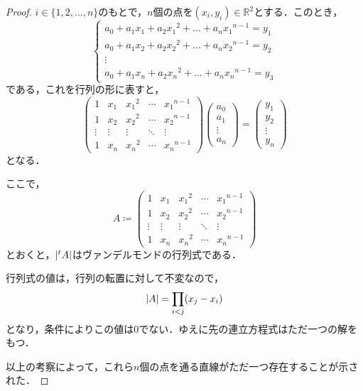 \documentclass[a4paper,10pt,fleqn]{ltjsarticle}
\begin{document}
\begin{tleftbar}
  \begin{proof}
    $i \in \{ 1,2,\ldots,n \}$のもとで，$n$個の点を$(x_i , y_i ) \in \mathbb{R}^2$とする．このとき，
    \[
      \begin{cases}
        a_0 + a_1 x_1 + a_2 {x_1}^2 + \dots + a_n {x_1}^{n-1} = y_1 \\
        a_0 + a_1 x_2 + a_2 {x_2}^2 + \dots + a_n {x_2}^{n-1} = y_2 \\
        \vdots                                                      \\
        a_0 + a_1 x_n + a_2 {x_n}^2 + \dots + a_n {x_n}^{n-1} = y_3
      \end{cases}
    \]
    である，これを行列の形に表すと，
    \[
      \begin{pmatrix}
        1      & x_1    & {x_1}^2 & \cdots & {x_1}^{n-1} \\
        1      & x_2    & {x_2}^2 & \cdots & {x_2}^{n-1} \\
        \vdots & \vdots & \vdots  & \ddots & \vdots      \\
        1      & x_n    & {x_n}^2 & \cdots & {x_n}^{n-1}
      \end{pmatrix}
      \begin{pmatrix}
        a_0    \\
        a_1    \\
        \vdots \\
        a_n
      \end{pmatrix}
      =
      \begin{pmatrix}
        y_1    \\
        y_2    \\
        \vdots \\
        y_n
      \end{pmatrix}
    \]
    となる．

    ここで，
    \[
      A \coloneqq
      \begin{pmatrix}
        1      & x_1    & {x_1}^2 & \cdots & {x_1}^{n-1} \\
        1      & x_2    & {x_2}^2 & \cdots & {x_2}^{n-1} \\
        \vdots & \vdots & \vdots  & \ddots & \vdots      \\
        1      & x_n    & {x_n}^2 & \cdots & {x_n}^{n-1}
      \end{pmatrix}
    \]
    とおくと，$\abs{{}^t A}$はヴァンデルモンドの行列式である．

    行列式の値は，行列の転置に対して不変なので，
    \[
      \abs{A}= \prod_{i < j} (x_j - x_i)
    \]
    となり，条件によりこの値は$0$でない．ゆえに先の連立方程式はただ一つの解をもつ．

    以上の考察によって，これら$n$個の点を通る直線がただ一つ存在することが示された．
  \end{proof}
\end{tleftbar}
\end{document}

